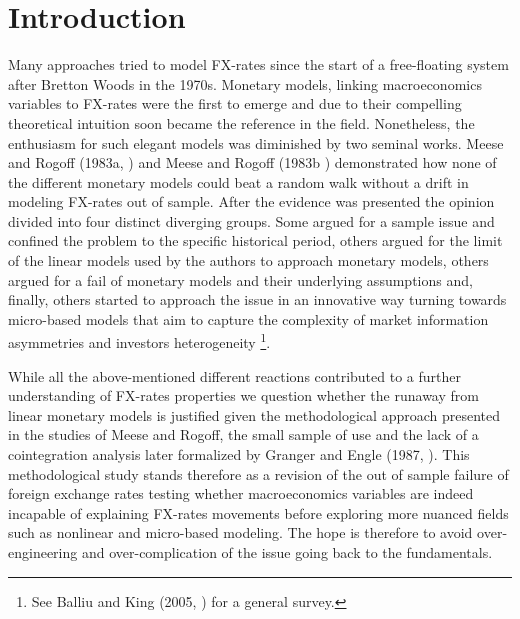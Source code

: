 \section{Introduction}

%
%
Many approaches tried to model FX-rates since the start of a free-floating system after Bretton Woods in the 1970s. Monetary models, linking macroeconomics variables to FX-rates were the first to emerge and due to their compelling theoretical intuition soon became the reference in the field. Nonetheless, the enthusiasm for such elegant models was diminished by two seminal works. Meese and Rogoff (1983a, \cite{MeeseRogoffa}) and Meese and Rogoff (1983b \cite{MeeseRogoffb}) demonstrated how none of the different monetary models could beat a random walk without a drift in modeling FX-rates out of sample. After the evidence was presented the opinion divided into four distinct diverging groups. Some argued for a sample issue and confined the problem to the specific historical period, others argued for the limit of the linear models used by the authors to approach monetary models, others argued for a fail of monetary models and their underlying assumptions and, finally, others started to approach the issue in an innovative way turning towards micro-based models that aim to capture the complexity of market information asymmetries and investors heterogeneity \footnote{See Balliu and King (2005, \cite{BalliuKing}) for a general survey.}.

While all the above-mentioned different reactions contributed to a further understanding of FX-rates properties we question whether the runaway from linear monetary models is justified given the methodological approach presented in the studies of Meese and Rogoff, the small sample of use and the lack of a cointegration analysis later formalized by Granger and Engle (1987,  \cite{EngleGranger}). 
% 
%
This methodological study stands therefore as a revision of the out of sample failure of foreign exchange rates testing whether macroeconomics variables are indeed incapable of explaining FX-rates movements before exploring more nuanced fields such as nonlinear and micro-based modeling. The hope is therefore to avoid over-engineering and over-complication of the issue going back to the fundamentals.

